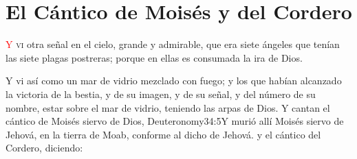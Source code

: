 
\chapter{El Cántico de Moisés y del Cordero}
\lettrine[lines=3,slope=-0.5em,loversize=0.1,lraise=0.1]{\textcolor{red}{Y}}{\hspace{0.5em} vi} otra señal en el cielo, grande y admirable, que era siete ángeles que tenían las siete plagas%
 postreras; porque en ellas es consumada la ira de Dios.
\newline

\zz
{}Y vi así como un mar de vidrio mezclado con fuego; y los que habían alcanzado la victoria de la bestia, y de su imagen, y de su señal, y del número de su nombre, estar sobre el mar de vidrio, teniendo las arpas de Dios.
Y cantan el cántico de Moisés%
 siervo de Dios,%
				   {Deuteronomy}{34:5}{Y murió allí Moisés siervo de Jehová, en la tierra de Moab, conforme al dicho de Jehová.}
 y el cántico del Cordero, diciendo:
